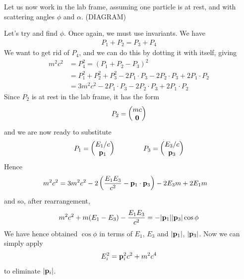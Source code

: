 \documentclass{../template/note}
\begin{document}
    Let us now work in the lab frame, assuming one particle is at rest, and with scattering angles \(\phi\) and \(\alpha\). (DIAGRAM) 
    
    Let's try and find \(\phi\). Once again, we must use invariants. We have
    \begin{align*}
        P_1 + P_2 = P_3 + P_4
    \end{align*}
    We want to get rid of \(P_4\), and we can do this by dotting it with itself, giving
    \begin{align*}
        m^2c^2 &= P_4^2 = (P_1 + P_2 - P_3)^2 \\
        &= P_1^2 + P_2^2 + P_3^2 - 2 P_1 \cdot P_3 - 2 P_2 \cdot P_3 + 2 P_1 \cdot P_2 \\
        &= 3m^2c^2 - 2 P_1 \cdot P_3 - 2 P_2 \cdot P_3 + 2 P_1 \cdot P_2
    \end{align*}
    Since \(P_2\) is at rest in the lab frame, it has the form
    \begin{align*}
        P_2 = \begin{pmatrix}
            mc \\
            \V 0 \\
        \end{pmatrix}
    \end{align*}
    and we are now ready to substitute
    \begin{align*}
        P_1 = \begin{pmatrix}
            E_1/c \\
            \V p_1 \\
        \end{pmatrix} \qquad \qquad P_3 = \begin{pmatrix}
            E_3/c \\
            \V p_3 \\
        \end{pmatrix}
    \end{align*}
    Hence
    \begin{align*}
        m^2c^2 &= 3m^2c^2 - 2 \left(\frac{E_1E_3}{c^2} - \V p_1 \cdot \V p_3\right) - 2 E_3m + 2E_1m
    \end{align*}
    and so, after rearrangement,
    \begin{align*}
        m^2c^2 + m(E_1-E_3) - \frac{E_1E_3}{c^2} = -|\V p_1||\V p_3| \cos \phi
    \end{align*}
    We have hence obtained \(\cos \phi\) in terms of \(E_1\), \(E_3\) and \(|\V p_1|\), \(|\V p_3|\). Now we can simply apply
    \begin{align*}
        E_i^2 = \V p_i^2 c^2 + m^2c^4
    \end{align*}
    to eliminate \(|\V p_i|\).
    
\end{document}
